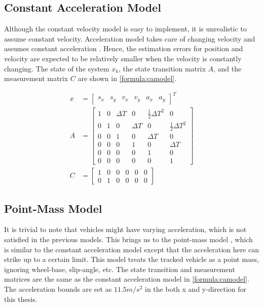 \subsection{Constant Acceleration Model}
Although the constant velocity model is easy to implement, it is unrealistic to assume constant velocity. Acceleration model takes care of changing velocity and assumes constant acceleration \cite{Schubert2008}. Hence, the estimation errors for position and velocity are expected to be relatively smaller when the velocity is constantly changing. The state of the system $x_k$, the state transition matrix $A$, and the measurement matrix $C$ are shown in \eqref{formula:camodel}.

\begin{equation}
\label{formula:camodel}
\begin{split}
x&= \left[\begin{matrix}
s_x & s_y & v_x & v_y & a_x & a_y
\end{matrix}\right]^{T}\\
A&= \left[\begin{matrix}
1 & 0 & \Delta T & 0 & \frac{1}{2}\Delta T^2 & 0\\
0 & 1 & 0 & \Delta T & 0 & \frac{1}{2}\Delta T^2 \\
0 & 0 & 1 & 0 & \Delta T & 0\\
0 & 0 & 0 & 1 & 0 & \Delta T\\
0 & 0 & 0 & 0 & 1 & 0\\
0 & 0 & 0 & 0 & 0 & 1
\end{matrix}\right] \\
C&= \left[\begin{matrix}
1 & 0 & 0 & 0 & 0 & 0\\
0 & 1 & 0 & 0 & 0 & 0
\end{matrix}\right]
\end{split}
\end{equation}

\subsection{Point-Mass Model}
It is trivial to note that vehicles might have varying acceleration, which is not satisfied in the previous models. This brings us to the point-mass model \cite{Althoff}, which is similar to the constant acceleration model except that the acceleration here can strike up to a certain limit. This model treats the tracked vehicle as a point mass, ignoring wheel-base, slip-angle, etc. The state transition and measurement matrices are the same as the constant acceleration model in \eqref{formula:camodel}. The acceleration bounds are set as $11.5 m/s^2$ \cite{Althoff} in the both x and y-direction for this thesis.

